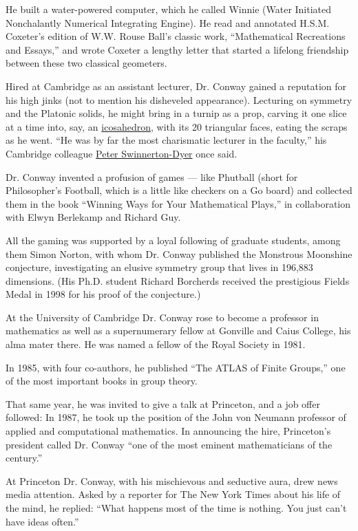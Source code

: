 He built a water-powered computer, which he called Winnie (Water
Initiated Nonchalantly Numerical Integrating Engine). He read and
annotated H.S.M. Coxeter's edition of W.W. Rouse Ball's classic work,
``Mathematical Recreations and Essays,'' and wrote Coxeter a lengthy
letter that started a lifelong friendship between these two classical
geometers.

Hired at Cambridge as an assistant lecturer, Dr. Conway gained a
reputation for his high jinks (not to mention his disheveled
appearance). Lecturing on symmetry and the Platonic solids, he might
bring in a turnip as a prop, carving it one slice at a time into, say,
an \href{https://mathworld.wolfram.com/Icosahedron.html}{icosahedron},
with its 20 triangular faces, eating the scraps as he went. ``He was by
far the most charismatic lecturer in the faculty,'' his Cambridge
colleague
\href{https://www.theguardian.com/science/2019/jan/09/sir-peter-swinnerton-dyer-obituary}{Peter
Swinnerton-Dyer} once said.

Dr. Conway invented a profusion of games --- like Phutball (short for
Philosopher's Football, which is a little like checkers on a Go board)
and collected them in the book ``Winning Ways for Your Mathematical
Plays,'' in collaboration with Elwyn Berlekamp and Richard Guy.

All the gaming was supported by a loyal following of graduate students,
among them Simon Norton, with whom Dr. Conway published the Monstrous
Moonshine conjecture, investigating an elusive symmetry group that lives
in 196,883 dimensions. (His Ph.D. student Richard Borcherds received the
prestigious Fields Medal in 1998 for his proof of the conjecture.)

At the University of Cambridge Dr. Conway rose to become a professor in
mathematics as well as a supernumerary fellow at Gonville and Caius
College, his alma mater there. He was named a fellow of the Royal
Society in 1981.

In 1985, with four co-authors, he published ``The ATLAS of Finite
Groups,'' one of the most important books in group theory.

That same year, he was invited to give a talk at Princeton, and a job
offer followed: In 1987, he took up the position of the John von Neumann
professor of applied and computational mathematics. In announcing the
hire, Princeton's president called Dr. Conway ``one of the most eminent
mathematicians of the century.''

At Princeton Dr. Conway, with his mischievous and seductive aura, drew
news media attention. Asked by a reporter for The New York Times about
his life of the mind, he replied: ``What happens most of the time is
nothing. You just can't have ideas often.''

